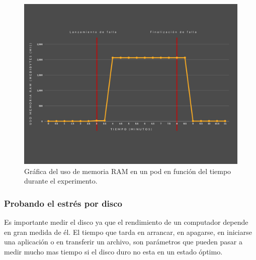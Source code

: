 \begin{figure}[htpb!]
	\centering
	\includegraphics[width=0.95\columnwidth]{images/graficaspruebas/usoram.png}
	\caption{Gráfica del uso de memoria RAM en un pod en función del tiempo durante el experimento.}
	\label{fig:usoram01}
\end{figure}

\subsubsection{Probando el estrés por disco}


\par Es importante medir el disco ya que el rendimiento de un computador depende en gran medida de él. El tiempo que tarda en arrancar, en apagarse, en iniciarse una aplicación o en transferir un archivo, son parámetros que pueden pasar a medir mucho mas tiempo si el disco duro no esta en un estado óptimo.\\


